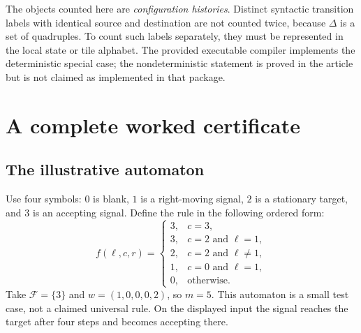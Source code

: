 \documentclass[11pt,letterpaper]{article}
\numberwithin{equation}{section}
\theoremstyle{definition}
\newcommand{\F}{\mathcal F}
\begin{document}
The objects counted here are \emph{configuration histories}. Distinct
syntactic transition labels with identical source and destination are not
counted twice, because $\Delta$ is a set of quadruples. To count such
labels separately, they must be represented in the local state or tile
alphabet. The provided executable compiler implements the deterministic
special case; the nondeterministic statement is proved in the article but
is not claimed as implemented in that package.

\section{A complete worked certificate}
\label{pwh:uh:sec:example}

\subsection{The illustrative automaton}

Use four symbols: $0$ is blank, $1$ is a right-moving signal, $2$ is a
stationary target, and $3$ is an accepting signal. Define the rule in the
following ordered form:
\begin{equation}
 f(\ell,c,r)=
 \begin{cases}
 3,&c=3,\\
 3,&c=2\text{ and }\ell=1,\\
 2,&c=2\text{ and }\ell\ne1,\\
 1,&c=0\text{ and }\ell=1,\\
 0,&\text{otherwise}.
 \end{cases}
 \label{pwh:uh:eq:example-rule}
\end{equation}
Take $\F=\{3\}$ and $w=(1,0,0,0,2)$, so $m=5$. This automaton is a
small test case, not a claimed universal rule. On the displayed input the
signal reaches the target after four steps and becomes accepting there.
\end{document}
